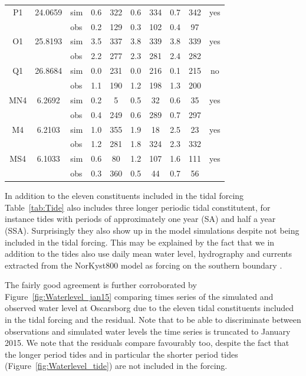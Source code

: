 \begin{table}[t]
\begin{tabular}{|c|c|l|cc|cc|cc|c|}
\small P1   & \small 24.0659 	& sim & 0.6 & 322 & 0.6 & 334 & 0.7 & 342 & yes  \\
\small      &        	& obs & 0.2 & 129 & 0.3 & 102 & 0.4 & 97 &    \\
\small O1   & \small 25.8193 	& sim & 3.5 & 337 & 3.8 & 339 & 3.8 & 339 & yes  \\
\small      &        	& obs & 2.2 & 277 & 2.3 & 281 & 2.4 & 282 &    \\
\small Q1   & \small 26.8684 	& sim & 0.0 & 231 & 0.0 & 216 & 0.1 & 215 & no   \\
\small      &        	& obs & 1.1 & 190 & 1.2 & 198 & 1.3 & 200 &    \\
\small MN4  & \small 6.2692 	& sim & 0.2 & 5 & 0.5 & 32 & 0.6 & 35 & yes  \\
\small      &        	& obs & 0.4 & 249 & 0.6 & 289 & 0.7 & 297 &    \\
\small M4   & \small 6.2103 	& sim & 1.0 & 355 & 1.9 & 18 & 2.5 & 23 & yes  \\
\small      &        	& obs & 1.2 & 281 & 1.8 & 324 & 2.3 & 332 &    \\
\small MS4  & \small 6.1033 	& sim & 0.6 & 80 & 1.2 & 107 & 1.6 & 111 & yes  \\
\small      &        	& obs & 0.3 & 360 & 0.5 & 44 & 0.7 & 56 &    \\
\hline
\end{tabular}
\end{table}

In addition to the eleven constituents included in the tidal forcing Table~\ref{tab:Tide} also includes three longer periodic tidal constitutent, for instance tides with periods of approximately one year (SA) and half a year (SSA). Surprisingly they also show up in the model simulations despite not being included in the tidal forcing. This may be explained by the fact that we in addition to the tides also use daily mean water level, hydrography and currents extracted from the NorKyst800 model as forcing on the southern boundary \citep{roed:etal:2016}. 

The fairly good agreement is further corroborated by Figure~\ref{fig:Waterlevel_jan15} comparing times series of the simulated and observed water level at Oscarsborg due to the eleven tidal constituents included in the tidal forcing and the residual. Note that to be able to discriminate between observations and simulated water levels the time series is truncated to January 2015. We note that the residuals compare favourably too, despite the fact that the longer period tides and in particular the shorter period tides (Figure~\ref{fig:Waterlevel_tide}) are not included in the forcing. 

